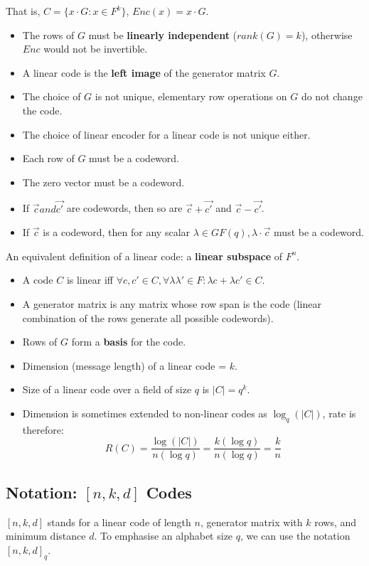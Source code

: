 \documentclass[11pt]{article}
\begin{document}
That is, $C = \{ x \cdot G : x \in F^k \}$, $Enc(x) = x \cdot G$. 

\begin{itemize}
  \item The rows of $G$ must be \textbf{linearly independent} ($rank(G) = k$), otherwise $Enc$ would not be invertible.
  \item A linear code is the \textbf{left image} of the generator matrix $G$.
  \item The choice of $G$ is not unique, elementary row operations on $G$ do not change the code.
  \item The choice of linear encoder for a linear code is not unique either.
  \item Each row of $G$ must be a codeword.
  \item The zero vector must be a codeword.
  \item If $\overrightarrow{c} and \overrightarrow{c'}$ are codewords, then so are $\overrightarrow{c} + \overrightarrow{c'}$ and $\overrightarrow{c} - \overrightarrow{c'}$.
  \item If $\overrightarrow{c}$ is a codeword, then for any scalar $\lambda \in GF(q), \lambda \cdot \overrightarrow{c}$ must be a codeword.
\end{itemize}

An equivalent definition of a linear code: a \textbf{linear subspace} of $F^n$.
\begin{itemize}
  \item A code $C$ is linear iff $\forall c, c' \in C, \forall \lambda \lambda' \in F : \lambda c + \lambda c' \in C$.
  \item A generator matrix is any matrix whose row span is the code (linear combination of the rows generate all possible codewords).
  \item Rows of $G$ form a \textbf{basis} for the code.
  \item Dimension (message length) of a linear code = $k$.
  \item Size of a linear code over a field of size $q$ is $\lvert C \rvert = q^k$.
  \item Dimension is sometimes extended to non-linear codes as $\log_q(\lvert C \rvert)$, rate is therefore:
    \[
      R(C) = \frac{\log (\lvert C \rvert)}{n (\log q)} = \frac{k (\log q)}{n (\log q)} = \frac{k}{n}
    \]
\end{itemize}

\subsection{Notation: $[n, k, d]$ Codes}
$[n, k, d]$ stands for a linear code of length $n$, generator matrix with $k$ rows, and minimum distance $d$.
To emphasise an alphabet size $q$, we can use the notation $[n, k, d]_q$.
\end{document}
